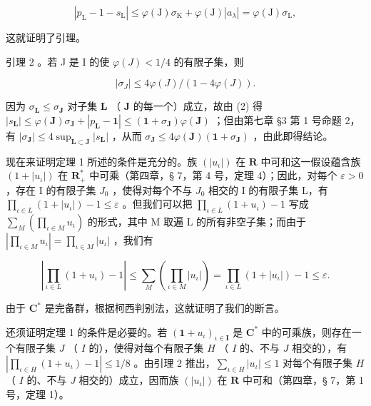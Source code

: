 \[
\left| p _ {\mathrm{L}} - \mathrm{1} - s _ {\mathrm{L}} \right| \leqslant \varphi (\mathrm{J}) \sigma_ {\mathrm{K}} + \varphi (\mathrm{J}) \left| a _ {\lambda} \right| = \varphi (\mathrm{J}) \sigma_ {\mathrm{L}},
\]

这就证明了引理。

引理 2 。若 J 是 I 的使 \(\varphi(J) < 1/4\) 的有限子集，则

\[
\left| \sigma_ {J} \right| \leqslant 4 \varphi (J) / (1 - 4 \varphi (J)).
\]

因为 \(\sigma_{\mathbf{L}} \leqslant \sigma_{\mathbf{J}}\) 对子集 \(\mathbf{L}\) （ \(\mathbf{J}\) 的每一个）成立，故由 (2) 得 \(|s_{\mathbf{L}}| \leqslant \varphi(\mathbf{J})\sigma_{\mathbf{J}} + |p_{\mathbf{L}} - \mathbf{1}| \leqslant (\mathbf{1} + \sigma_{\mathbf{J}})\varphi(\mathbf{J})\) ；但由第七章 §3 第 1 号命题 2，有 \(|\sigma_{\mathbf{J}}| \leqslant 4\sup_{\mathbf{L} \subset \mathbf{J}} |s_{\mathbf{L}}|\) ，从而 \(\sigma_{\mathbf{J}} \leqslant 4\varphi(\mathbf{J})(\mathbf{1} + \sigma_{\mathbf{J}})\) ，由此即得结论。

现在来证明定理 1 所述的条件是充分的。族 \((|u_{\iota}|)\) 在 \(\mathbf{R}\) 中可和这一假设蕴含族 \((\mathrm{1} + |u_{\iota}|)\) 在 \(\mathbf{R}_{+}^{*}\) 中可乘（第四章，§ 7，第 4 号，定理 4）；因此，对每个 \(\varepsilon > 0\) ，存在 I 的有限子集 \(J_{0}\) ，使得对每个不与 \(J_{0}\) 相交的 I 的有限子集 L，有 \(\prod_{\iota \in L} (\mathrm{1} + |u_{\iota}|) - \mathrm{1} \leqslant \varepsilon\) 。但我们可以把 \(\prod_{\iota \in L} (\mathrm{1} + u_{\iota}) - \mathrm{1}\) 写成 \(\sum_{M} \left( \prod_{\iota \in M} u_{\iota} \right)\) 的形式，其中 M 取遍 L 的所有非空子集；而由于 \(\left| \prod_{\iota \in M} u_{\iota} \right| = \prod_{\iota \in M} |u_{\iota}|\) ，我们有

\[
\left| \prod_ {\iota \in L} (1 + u _ {\iota}) - 1 \right| \leqslant \sum_ {M} \left(\prod_ {\iota \in M} | u _ {\iota} |\right) = \prod_ {\iota \in L} (1 + | u _ {\iota} |) - 1 \leqslant \varepsilon .
\]

由于 \(\mathbf{C}^*\) 是完备群，根据柯西判别法，这就证明了我们的断言。

还须证明定理 1 的条件是必要的。若 \((\mathbf{1} + u_{\iota})_{\iota\in \mathbf{I}}\) 是 \(\mathbf{C}^*\) 中的可乘族，则存在一个有限子集 \(J\) （ \(I\) 的），使得对每个有限子集 \(H\) （ \(I\) 的、不与 \(J\) 相交的），有 \(\left|\prod_{\iota\in H}(1 + u_{\iota}) - 1\right| \leqslant 1/8\) 。由引理 2 推出，\(\sum_{\iota\in H}|u_{\iota}| \leqslant 1\) 对每个有限子集 \(H\) （ \(I\) 的、不与 \(J\) 相交的）成立，因而族 \((|u_{\iota}|)\) 在 \(\mathbf{R}\) 中可和（第四章，§ 7，第 1 号，定理 1）。

